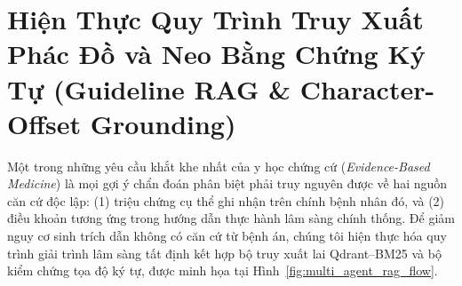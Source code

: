 \section{Hiện Thực Quy Trình Truy Xuất Phác Đồ và Neo Bằng Chứng Ký Tự (Guideline RAG \& Character-Offset Grounding)}
\label{sec:multi_agent_rag}

Một trong những yêu cầu khắt khe nhất của y học chứng cứ (\textit{Evidence-Based Medicine}) là mọi gợi ý chẩn đoán phân biệt phải truy nguyên được về hai nguồn căn cứ độc lập: (1) triệu chứng cụ thể ghi nhận trên chính bệnh nhân đó, và (2) điều khoản tương ứng trong hướng dẫn thực hành lâm sàng chính thống. Để giảm nguy cơ sinh trích dẫn không có căn cứ từ bệnh án, chúng tôi hiện thực hóa quy trình giải trình lâm sàng tất định kết hợp bộ truy xuất lai Qdrant--BM25 và bộ kiểm chứng tọa độ ký tự, được minh họa tại Hình~\ref{fig:multi_agent_rag_flow}.



